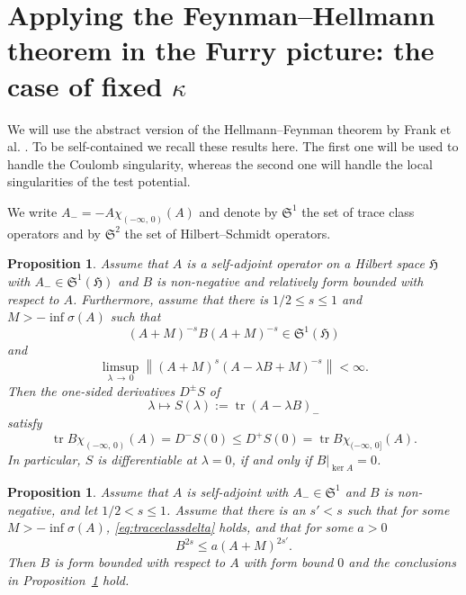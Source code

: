\documentclass[10pt]{amsart}
\newtheorem{prop}[cdrthm]{Proposition}
\theoremstyle{definition}
\DeclareMathOperator{\tr}{tr}
\newcommand*\gH{\mathfrak{H}}
\newcommand*\gS{\mathfrak{S}}
\begin{document}
\section{Applying the Feynman--Hellmann theorem in the Furry picture: the case of fixed \texorpdfstring{$\kappa$}{kappa}}

We will use the abstract version of the Hellmann--Feynman theorem by Frank et al. \cite[Theorem~3.2 and Proposition~3.3]{Franketal2020P}. To be self-contained we recall these results here. The first one will be used to handle the Coulomb singularity, whereas the second one will handle the local singularities of the test potential.

We write $A_-=-A\chi_{(-\infty,\,0)}(A)$ and denote by $\gS^1$ the set of trace class operators and by $\gS^2$ the set of Hilbert--Schmidt operators.

\begin{prop}\label{diffgen0}
Assume that $A$ is a self-adjoint operator on a Hilbert space $\gH$ with $A_-\in\gS^1(\gH)$ and $B$ is non-negative and relatively form bounded with respect to $A$. Furthermore, assume that there is $1/2\leq s\leq 1$ and $M>-\inf\sigma(A)$ such that
\begin{equation}\label{eq:traceclassdelta}
(A+M)^{-s} B (A+M)^{-s}\in\gS^1(\gH)
\end{equation}
and
\begin{equation}\label{eq:relbounddelta}
\limsup_{\lambda\,\to\,0} \left\| (A+M)^{s} (A-\lambda B+M)^{-s} \right\| <\infty.
\end{equation}
Then the one-sided derivatives $D^\pm S$ of
\[
\lambda\mapsto S(\lambda):=\tr(A-\lambda B)_-
\]
satisfy
\[
\tr B\chi_{(-\infty,\,0)}(A)=D^-S(0)\leq D^+S(0)=\tr B\chi_{(-\infty,\,0]}(A).
\]
In particular, $S$ is differentiable at $\lambda=0$, if and only if $B|_{\ker A}=0$.
\end{prop}

\begin{prop}\label{diffgen}
Assume that $A$ is self-adjoint with $A_{-} \in\gS^1$ and $B$ is non-negative, and let $1/2<s\leq1$. Assume that there is an $s'<s$ such that for some $M>-\inf\sigma(A)$, \eqref{eq:traceclassdelta} holds, and that for some $a>0$
\begin{equation}\label{eq:increasedrelbdd}
B^{2s} \leq a(A+M)^{2s'}.
\end{equation}
Then $B$ is form bounded with respect to $A$ with form bound $0$ and the conclusions in Proposition~\ref{diffgen0} hold.
\end{prop}
\end{document}
